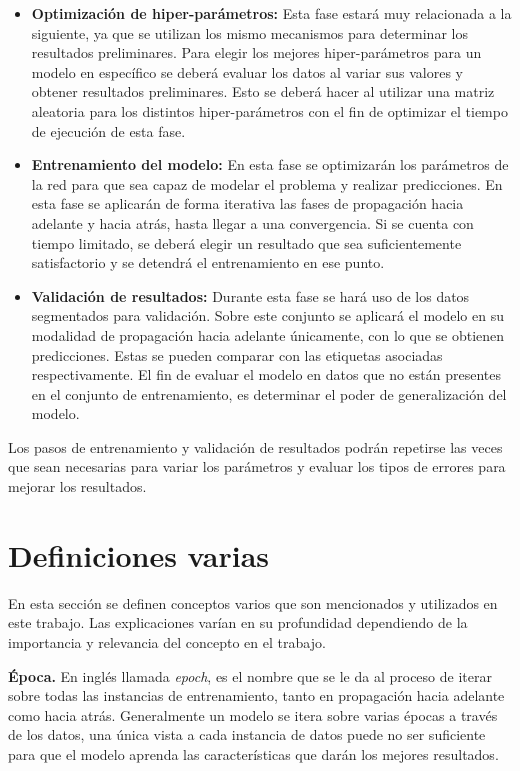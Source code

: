 \begin{itemize}
\item \textbf{Optimización de hiper-parámetros:} Esta fase estará muy relacionada a la siguiente, ya que se utilizan los mismo mecanismos para determinar los resultados preliminares. Para elegir los mejores hiper-parámetros para un modelo en específico se deberá evaluar los datos al variar sus valores y obtener resultados preliminares. Esto se deberá hacer al utilizar una matriz aleatoria para los distintos hiper-parámetros con el fin de optimizar el tiempo de ejecución de esta fase.

\item \textbf{Entrenamiento del modelo:} En esta fase se optimizarán los parámetros de la red para que sea capaz de modelar el problema y realizar predicciones. En esta fase se aplicarán de forma iterativa las fases de propagación hacia adelante y hacia atrás, hasta llegar a una convergencia. Si se cuenta con tiempo limitado, se deberá elegir un resultado que sea suficientemente satisfactorio y se detendrá el entrenamiento en ese punto.

\item \textbf{Validación de resultados:} Durante esta fase se hará uso de los datos segmentados para validación. Sobre este conjunto se aplicará el modelo en su modalidad de propagación hacia adelante únicamente, con lo que se obtienen predicciones. Estas se pueden comparar con las etiquetas asociadas respectivamente. El fin de evaluar el modelo en datos que no están presentes en el conjunto de entrenamiento, es determinar el poder de generalización del modelo.

\end{itemize}

Los pasos de entrenamiento y validación de resultados podrán repetirse las veces que sean necesarias para variar los parámetros y evaluar los tipos de errores para mejorar los resultados.

\section{Definiciones varias}

En esta sección se definen conceptos varios que son mencionados y utilizados en este trabajo. Las explicaciones varían en su profundidad dependiendo de la importancia y relevancia del concepto en el trabajo.

\textbf{Época.} En inglés llamada \emph{epoch}, es el nombre que se le da al proceso de iterar sobre todas las instancias de entrenamiento, tanto en propagación hacia adelante como hacia atrás. Generalmente un modelo se itera sobre varias épocas a través de los datos, una única vista a cada instancia de datos puede no ser suficiente para que el modelo aprenda las características que darán los mejores resultados.


